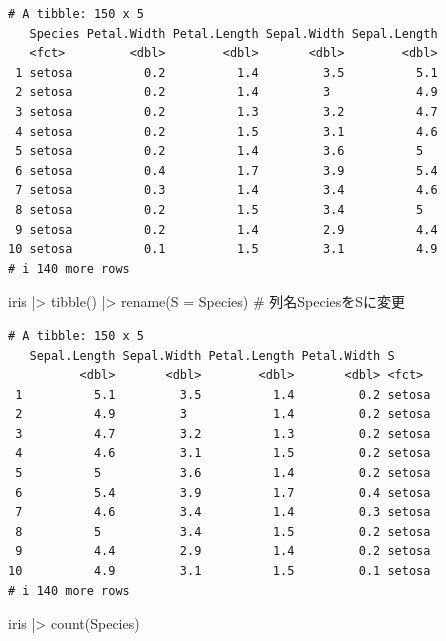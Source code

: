\documentclass[
  letterpaper,
  DIV=11,
  numbers=noendperiod]{scrreprt}
\newenvironment{Shaded}{\begin{snugshade}}{\end{snugshade}}
\newcommand{\AttributeTok}[1]{\textcolor[rgb]{0.40,0.45,0.13}{#1}}
\newcommand{\CommentTok}[1]{\textcolor[rgb]{0.37,0.37,0.37}{#1}}
\newcommand{\FunctionTok}[1]{\textcolor[rgb]{0.28,0.35,0.67}{#1}}
\newcommand{\NormalTok}[1]{\textcolor[rgb]{0.00,0.23,0.31}{#1}}
\newcommand{\SpecialCharTok}[1]{\textcolor[rgb]{0.37,0.37,0.37}{#1}}
\begin{document}
\begin{verbatim}
# A tibble: 150 x 5
   Species Petal.Width Petal.Length Sepal.Width Sepal.Length
   <fct>         <dbl>        <dbl>       <dbl>        <dbl>
 1 setosa          0.2          1.4         3.5          5.1
 2 setosa          0.2          1.4         3            4.9
 3 setosa          0.2          1.3         3.2          4.7
 4 setosa          0.2          1.5         3.1          4.6
 5 setosa          0.2          1.4         3.6          5  
 6 setosa          0.4          1.7         3.9          5.4
 7 setosa          0.3          1.4         3.4          4.6
 8 setosa          0.2          1.5         3.4          5  
 9 setosa          0.2          1.4         2.9          4.4
10 setosa          0.1          1.5         3.1          4.9
# i 140 more rows
\end{verbatim}

\begin{Shaded}
\begin{Highlighting}[]
\NormalTok{iris }\SpecialCharTok{|\textgreater{}} \FunctionTok{tibble}\NormalTok{() }\SpecialCharTok{|\textgreater{}} \FunctionTok{rename}\NormalTok{(}\AttributeTok{S =}\NormalTok{ Species) }\CommentTok{\# 列名SpeciesをSに変更}
\end{Highlighting}
\end{Shaded}

\begin{verbatim}
# A tibble: 150 x 5
   Sepal.Length Sepal.Width Petal.Length Petal.Width S     
          <dbl>       <dbl>        <dbl>       <dbl> <fct> 
 1          5.1         3.5          1.4         0.2 setosa
 2          4.9         3            1.4         0.2 setosa
 3          4.7         3.2          1.3         0.2 setosa
 4          4.6         3.1          1.5         0.2 setosa
 5          5           3.6          1.4         0.2 setosa
 6          5.4         3.9          1.7         0.4 setosa
 7          4.6         3.4          1.4         0.3 setosa
 8          5           3.4          1.5         0.2 setosa
 9          4.4         2.9          1.4         0.2 setosa
10          4.9         3.1          1.5         0.1 setosa
# i 140 more rows
\end{verbatim}

\begin{Shaded}
\begin{Highlighting}[]
\NormalTok{iris }\SpecialCharTok{|\textgreater{}} \FunctionTok{count}\NormalTok{(Species)}
\end{Highlighting}
\end{Shaded}
\end{document}
